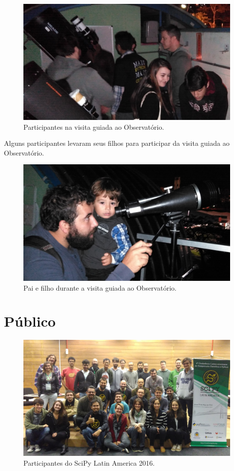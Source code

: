 \documentclass[12pt]{article}
\begin{document}
\begin{figure}[!htb]
\center
\includegraphics[height=.3\textheight]{social-astro.jpg}
\caption{Participantes na visita guiada ao Observatório.}
\end{figure}

Alguns participantes levaram seus filhos para participar da visita guiada ao
Observatório.

\begin{figure}[!htb]
\center
\includegraphics[height=.3\textheight]{social-family.jpg}
\caption{Pai e filho durante a visita guiada ao Observatório.}
\end{figure}

\clearpage
\newpage

\section*{Público}

\begin{figure}[!htb]
\center
\includegraphics[height=.3\textheight]{group.jpg}
\caption{Participantes do SciPy Latin America 2016.}
\end{figure}
\end{document}
